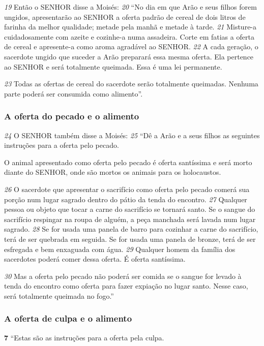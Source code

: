 \bigskip
\textit{\tiny 19}
Então o SENHOR disse a Moisés: 
\textit{\tiny 20}
“No dia em que Arão e seus filhos forem
ungidos, apresentarão ao SENHOR a oferta padrão de cereal de dois litros de
farinha da melhor qualidade; metade pela manhã e metade à tarde. 
\textit{\tiny 21}
Misture-a
cuidadosamente com azeite e cozinhe-a numa assadeira. Corte em fatias a oferta
de cereal e apresente-a como aroma agradável ao SENHOR. 
\textit{\tiny 22}
A cada geração, o
sacerdote ungido que suceder a Arão preparará essa mesma oferta. Ela pertence
ao SENHOR e será totalmente queimada. Essa é uma lei permanente. 

\smallskip
\textit{\tiny 23}
Todas as
ofertas de cereal do sacerdote serão totalmente queimadas. Nenhuma parte
poderá ser consumida como alimento”.

\bigskip
\subsubsection*{A oferta do pecado e o alimento}  
\textit{\tiny 24}
O SENHOR também disse a Moisés: 
\textit{\tiny 25}
“Dê a Arão e a seus filhos as seguintes
instruções para a oferta pelo pecado. 

\smallskip
O animal apresentado como oferta pelo
pecado é oferta santíssima e será morto diante do SENHOR, onde são mortos os
animais para os holocaustos. 

\smallskip
\textit{\tiny 26}
O sacerdote que apresentar o sacrifício como
oferta pelo pecado comerá sua porção num lugar sagrado dentro do pátio da
tenda do encontro. 
\textit{\tiny 27}
Qualquer pessoa ou objeto que tocar a carne do sacrifício se
tornará santo. Se o sangue do sacrifício respingar na roupa de alguém, a peça
manchada será lavada num lugar sagrado. 
\textit{\tiny 28}
Se for usada uma panela de barro
para cozinhar a carne do sacrifício, terá de ser quebrada em seguida. Se for usada
uma panela de bronze, terá de ser esfregada e bem enxaguada com água.
\textit{\tiny 29}
Qualquer homem da família dos sacerdotes poderá comer dessa oferta. É oferta
santíssima. 

\smallskip
\textit{\tiny 30}
Mas a oferta pelo pecado não poderá ser comida se o sangue for
levado à tenda do encontro como oferta para fazer expiação no lugar santo. Nesse
caso, será totalmente queimada no fogo.”
   
\bigskip
\subsubsection*{A oferta de culpa e o alimento}  
\textbf{\large 7} “Estas são as instruções para a oferta pela culpa. 


